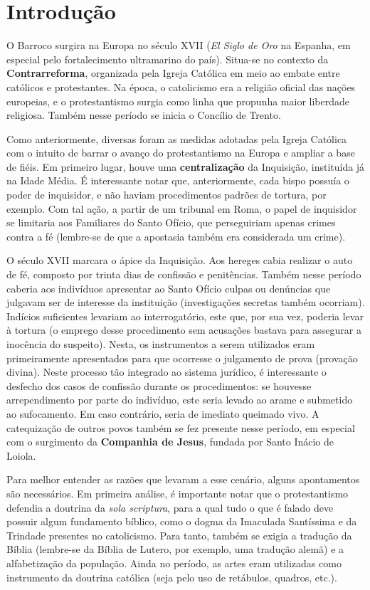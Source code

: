 \documentclass[12pt]{book}
\begin{document}
 			\chapter{Introdução}
 			\par O Barroco surgira na Europa no século XVII (\textit{El Siglo de Oro} na Espanha, em especial pelo fortalecimento ultramarino do país). Situa-se no contexto da \textbf{Contrarreforma}, organizada pela Igreja Católica em meio ao embate entre católicos e protestantes. Na época, o catolicismo era a religião oficial das nações europeias, e o protestantismo surgia como linha que propunha maior liberdade religiosa. Também nesse período se inicia o Concílio de Trento.
 			\par Como anteriormente, diversas foram as medidas adotadas pela Igreja Católica com o intuito de barrar o avanço do protestantismo na Europa e ampliar a base de fiéis. Em primeiro lugar, houve uma \textbf{centralização} da Inquisição, instituída já na Idade Média. É interessante notar que, anteriormente, cada bispo possuía o poder de inquisidor, e não haviam procedimentos padrões de tortura, por exemplo. Com tal ação, a partir de um tribunal em Roma, o papel de inquisidor se limitaria aos Familiares do Santo Ofício, que perseguiriam apenas crimes contra a fé (lembre-se de que a apostasia também era considerada um crime). 
 			\par O século XVII marcara o ápice da Inquisição. Aos hereges cabia realizar o auto de fé, composto por trinta dias de confissão e penitências. Também nesse período caberia aos indivíduos apresentar ao Santo Ofício culpas ou denúncias que julgavam ser de interesse da instituição (investigações secretas também ocorriam). Indícios suficientes levariam ao interrogatório, este que, por sua vez, poderia levar à tortura (o emprego desse procedimento sem acusações bastava para assegurar a inocência do suspeito). Nesta, os instrumentos a serem utilizados eram primeiramente apresentados para que ocorresse o julgamento de prova (provação divina). Neste processo tão integrado ao sistema jurídico, é interessante o desfecho dos casos de confissão durante os procedimentos: se houvesse arrependimento por parte do indivíduo, este seria levado ao arame e submetido ao sufocamento. Em caso contrário, seria de imediato queimado vivo. A catequização de outros povos também se fez presente nesse período, em especial com o surgimento da \textbf{Companhia de Jesus}, fundada por Santo Inácio de Loiola.
 			\par Para melhor entender as razões que levaram a esse cenário, alguns apontamentos são necessários. Em primeira análise, é importante notar que o protestantismo defendia a doutrina da \textit{sola scriptura}, para a qual tudo o que é falado deve possuir algum fundamento bíblico, como o dogma da Imaculada Santíssima e da Trindade presentes no catolicismo. Para tanto, também se exigia a tradução da Bíblia (lembre-se da Bíblia de Lutero, por exemplo, uma tradução alemã) e a alfabetização da população. Ainda no período, as artes eram utilizadas como instrumento da doutrina católica (seja pelo uso de retábulos, quadros, etc.). 
\end{document}
